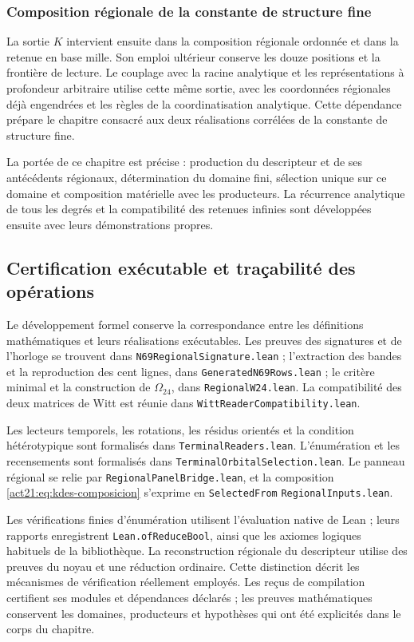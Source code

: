 \subsubsection{Composition régionale de la constante de structure fine}

La sortie $K$ intervient ensuite dans la composition régionale
ordonnée et dans la retenue en base mille. Son emploi ultérieur conserve les
douze positions et la frontière de lecture. Le couplage avec la racine
analytique et les représentations à profondeur arbitraire utilise cette
même sortie, avec les coordonnées régionales déjà engendrées et les
règles de la coordinatisation analytique. Cette dépendance prépare le chapitre
consacré aux deux réalisations corrélées de la constante de
structure fine.

La portée de ce chapitre est précise : production du descripteur et de ses antécédents régionaux, détermination du domaine fini, sélection unique sur ce domaine et composition matérielle avec les producteurs. La récurrence analytique de tous les degrés et la compatibilité des retenues infinies sont développées ensuite avec leurs démonstrations propres.

\subsection{Certification exécutable et traçabilité des opérations}

Le développement formel conserve la correspondance entre les
définitions mathématiques et leurs réalisations exécutables. Les preuves
des signatures et de l'horloge se trouvent dans
\texttt{N69RegionalSignature.lean} ; l'extraction des bandes et la
reproduction des cent lignes, dans
\texttt{GeneratedN69Rows.lean} ; le critère minimal et la construction
de $\Omega_{24}$, dans \texttt{RegionalW24.lean}. La compatibilité des
deux matrices de Witt est réunie dans
\texttt{WittReaderCompatibility.lean}.

Les lecteurs temporels, les rotations, les résidus orientés et la
condition hétérotypique sont formalisés dans
\texttt{TerminalReaders.lean}. L'énumération et les recensements sont
formalisés dans \texttt{Terminal}\allowbreak\texttt{Orbital}\allowbreak\texttt{Selection.lean}. Le panneau
régional se relie par \texttt{Regional}\allowbreak\texttt{Panel}\allowbreak\texttt{Bridge.lean}, et la
composition \eqref{act21:eq:kdes-composicion} s'exprime en
\texttt{Selected}\allowbreak\texttt{From}\allowbreak%
\texttt{Regional}\allowbreak\texttt{Inputs.lean}.

Les vérifications finies d'énumération utilisent l'évaluation native de Lean ; leurs rapports enregistrent \texttt{Lean.ofReduceBool}, ainsi que les axiomes logiques habituels de la bibliothèque. La reconstruction régionale du descripteur utilise des preuves du noyau et une réduction ordinaire. Cette distinction décrit les mécanismes de vérification réellement employés. Les reçus de compilation certifient ses modules et dépendances déclarés ; les preuves mathématiques conservent les domaines, producteurs et hypothèses qui ont été explicités dans le corps du chapitre.
